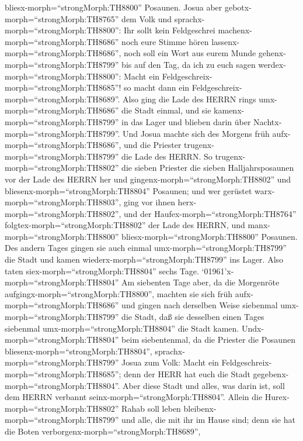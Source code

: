 bliesx-morph=``strongMorph:TH8800'' Posaunen.  Josua aber
gebotx-morph=``strongMorph:TH8765'' dem Volk und
sprachx-morph=``strongMorph:TH8800'': Ihr sollt kein Feldgeschrei
machenx-morph=``strongMorph:TH8686'' noch eure Stimme hören
lassenx-morph=``strongMorph:TH8686'', noch soll ein Wort aus eurem Munde
gehenx-morph=``strongMorph:TH8799'' bis auf den Tag, da ich zu euch
sagen werdex-morph=``strongMorph:TH8800'': Macht ein
Feldgeschreix-morph=``strongMorph:TH8685''! so macht dann ein
Feldgeschreix-morph=``strongMorph:TH8689''.  Also ging die
Lade des HERRN rings umx-morph=``strongMorph:TH8686'' die Stadt einmal,
und sie kamenx-morph=``strongMorph:TH8799'' in das Lager und blieben
darin über Nachtx-morph=``strongMorph:TH8799''.  Und Josua
machte sich des Morgens früh aufx-morph=``strongMorph:TH8686'', und die
Priester trugenx-morph=``strongMorph:TH8799'' die Lade des HERRN.
 So trugenx-morph=``strongMorph:TH8802'' die sieben
Priester die sieben Halljahrsposaunen vor der Lade des HERRN her und
gingenx-morph=``strongMorph:TH8802'' und
bliesenx-morph=``strongMorph:TH8804'' Posaunen; und wer gerüstet
warx-morph=``strongMorph:TH8803'', ging vor ihnen
herx-morph=``strongMorph:TH8802'', und der
Haufex-morph=``strongMorph:TH8764'' folgtex-morph=``strongMorph:TH8802''
der Lade des HERRN, und manx-morph=``strongMorph:TH8800''
bliesx-morph=``strongMorph:TH8800'' Posaunen.  Des andern
Tages gingen sie auch einmal umx-morph=``strongMorph:TH8799'' die Stadt
und kamen wiederx-morph=``strongMorph:TH8799'' ins Lager. Also taten
siex-morph=``strongMorph:TH8804'' sechs Tage. 
`01961'\textbar x-morph=``strongMorph:TH8804'' Am siebenten Tage aber,
da die Morgenröte aufgingx-morph=``strongMorph:TH8800'', machten sie
sich früh aufx-morph=``strongMorph:TH8686'' und gingen nach derselben
Weise siebenmal umx-morph=``strongMorph:TH8799'' die Stadt, daß sie
desselben einen Tages siebenmal umx-morph=``strongMorph:TH8804'' die
Stadt kamen.  Undx-morph=``strongMorph:TH8804'' beim
siebentenmal, da die Priester die Posaunen
bliesenx-morph=``strongMorph:TH8804'',
sprachx-morph=``strongMorph:TH8799'' Josua zum Volk: Macht ein
Feldgeschreix-morph=``strongMorph:TH8685''; denn der HERR hat euch die
Stadt gegebenx-morph=``strongMorph:TH8804''.  Aber diese
Stadt und alles, was darin ist, soll dem HERRN verbannt
seinx-morph=``strongMorph:TH8804''. Allein die
Hurex-morph=``strongMorph:TH8802'' Rahab soll leben
bleibenx-morph=``strongMorph:TH8799'' und alle, die mit ihr im Hause
sind; denn sie hat die Boten verborgenx-morph=``strongMorph:TH8689'',
